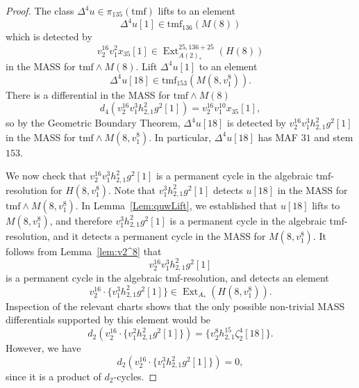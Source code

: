 \documentclass[10pt]{amsart}
\newcommand{\tmf}{\mathrm{tmf}}
\theoremstyle{definition}
\numberwithin{equation}{section}
\numberwithin{figure}{section}
\DeclareMathOperator{\Ext}{Ext}
\begin{document}
\begin{proof}
The class $\Delta^4 u \in \pi_{135}(\tmf)$ lifts to an element
$$\Delta^4 u[1] \in \tmf_{136}(M(8))$$
which is detected by
$$v_2^{16}v_1^2 x_{35}[1] \in \Ext^{25,136+25}_{A(2)_*}(H(8))$$
in the MASS for $\tmf \wedge M(8)$. Lift $\Delta^4 u[1]$ to an element
$$\Delta^4 u[18] \in \tmf_{153}(M(8,v_1^8)).$$
There is a differential in the MASS for $\tmf \wedge M(8)$
$$d_4(v_2^{16} v_1^3 h_{2,1}^2 g^2[1]) = v_2^{16}v_1^{10} x_{35}[1],$$
so by the Geometric Boundary Theorem, $\Delta^4 u[18]$ is detected by $v_2^{16}v_1^3h^2_{2,1}g^2[1]$ in the MASS for $\tmf \wedge M(8,v_1^8)$. In particular, $\Delta^4 u[18]$ has MAF $31$ and stem $153$. 

We now check that $v_2^{16}v_1^3h_{2,1}^2g^2[1]$ is a permanent cycle in the algebraic $\tmf$-resolution for $H(8,v_1^8)$.  Note that $v_1^3h^2_{2,1}g^2[1]$ detects $u[18]$ in the MASS for $\tmf \wedge M(8,v_1^8)$.  In Lemma~\ref{Lem:quwLift}, we established that $u[18]$ lifts to $M(8,v_1^8)$, and therefore $v_1^3h^2_{2,1}g^2[1]$ is a permanent cycle in the algebraic tmf-resolution, and it detects a permanent cycle in the MASS for $M(8,v_1^8)$.
It follows from Lemma~\ref{lem:v2^8} that
$$ v_2^{16}v_1^3h_{2,1}^2g^2[1] $$
is a permanent cycle in the algebraic tmf-resolution, and detects an element
$$ v_2^{16} \cdot \{v_1^3h_{2,1}^2g^2[1]\} \in \Ext_{A_*}(H(8,v_1^8)). $$
Inspection of the relevant charts shows that the only possible non-trivial MASS differentials supported by this element would be
$$d_2(v_2^{16}\cdot \{v_1^2h_{2,1}^2g^2[1]\}) = \{ v_2^8 h^{15}_{2,1}\zeta_2^4[18] \}. $$
However, we have
$$ d_2(v_2^{16} \cdot \{v_1^3h_{2,1}^2g^2[1]\}) = 0, $$
since it is a product of $d_2$-cycles.
\end{proof}
\end{document}
